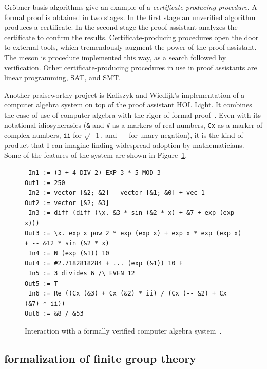 \documentclass{llncs}
\begin{document}

Gr\"obner basis algorithms give an example of a {\it
  certificate-producing procedure}.  A formal proof is obtained in two
stages.  In the first stage an unverified algorithm produces a
certificate.  In the second stage the proof assistant analyzes the
certificate to confirm the results.  Certificate-producing procedures
open the door to external tools, which tremendously augment the power
of the proof assistant.  The meson is procedure implemented this way,
as a search followed by verification.  Other certificate-producing
procedures in use in proof assistants are linear programming, SAT, and
SMT.


\smallskip

Another praiseworthy project is Kaliszyk and Wiedijk's implementation
of a computer algebra system on top of the proof assistant HOL Light.
It combines the ease of use of computer algebra with the rigor of
formal proof~\cite{kaliszyk_p04_calc}.  Even with its notational
idiosyncrasies (\verb!&! and \verb!#! as a markers of real numbers,
\verb!Cx! as a marker of complex numbers, \verb!ii! for $\sqrt{-1}$,
and \verb!--! for unary negation), it is the kind of product that I
can imagine finding widespread adoption by mathematicians. Some of the features
of the system are shown in Figure~\ref{fig:kw}.

\begin{figure}
\begin{verbatim}
 In1 := (3 + 4 DIV 2) EXP 3 * 5 MOD 3 
Out1 := 250 
 In2 := vector [&2; &2] - vector [&1; &0] + vec 1 
Out2 := vector [&2; &3] 
 In3 := diff (diff (\x. &3 * sin (&2 * x) + &7 + exp (exp x))) 
Out3 := \x. exp x pow 2 * exp (exp x) + exp x * exp (exp x) + -- &12 * sin (&2 * x) 
 In4 := N (exp (&1)) 10 
Out4 := #2.7182818284 + ... (exp (&1)) 10 F 
 In5 := 3 divides 6 /\ EVEN 12 
Out5 := T 
 In6 := Re ((Cx (&3) + Cx (&2) * ii) / (Cx (-- &2) + Cx (&7) * ii)) 
Out6 := &8 / &53 
\end{verbatim}
\caption{Interaction with a formally verified computer algebra system~\cite{kaliszyk_p04_calc}.}
\label{fig:kw}
\end{figure}







\subsection{formalization of finite group theory}
\end{document}
